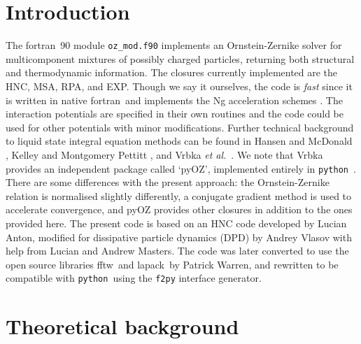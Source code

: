 \documentclass[12pt,a4paper]{article}
\newcommand{\latin}[1]{\emph{#1}}
\newcommand{\etal}{\latin{et al.}}
\newcommand{\FORTRAN}{{\sc fortran}}
\newcommand{\python}{{\tt python}}
\newcommand{\LAPACK}{{\sc lapack}}
\newcommand{\FFTW}{{\sc fftw}}
\begin{document}
\section{Introduction}
%
The \FORTRAN\ 90 module \verb+oz_mod.f90+ implements an
Ornstein-Zernike solver for multicomponent mixtures of possibly
charged particles, returning both structural and thermodynamic
information.  The closures currently implemented are the HNC, MSA,
RPA, and EXP.  Though we say it ourselves, the code is \emph{fast}
since it is written in native \FORTRAN\ and implements the Ng
acceleration schemes \cite{Ng74}.  The interaction potentials are
specified in their own routines and the code could be used for other
potentials with minor modifications.  Further technical background to
liquid state integral equation methods can be found in Hansen and
McDonald \cite{HM06}, Kelley and Montgomery Pettitt \cite{KMP04}, and
Vrbka \etal\ \cite{Vrbka09}.  We note that Vrbka provides an
independent package called `pyOZ', implemented entirely in
\python~\cite{Vrbka09}.  There are some differences with the present
approach: the Ornstein-Zernike relation is normalised slightly
differently, a conjugate gradient method is used to accelerate
convergence, and pyOZ provides other closures in addition to the ones
provided here.  The present code is based on an HNC code developed by
Lucian Anton, modified for dissipative particle dynamics (DPD) by
Andrey Vlasov with help from Lucian and Andrew Masters.  The code was
later converted to use the open source libraries \FFTW\ and
\LAPACK\ by Patrick Warren, and rewritten to be compatible with
\python\ using the \verb+f2py+ interface generator.

\section{Theoretical background}
%
\end{document}
